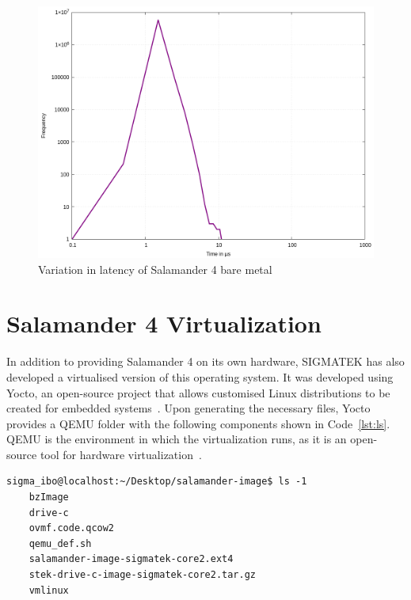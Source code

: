 \documentclass[MMR,Master,english]{twbook}
\begin{document}
\begin{figure}[H]
	\centering
	\includegraphics[width=0.7\columnwidth]{masterthesis-documentation/docs/sigmatek/xenomai/0hardware/gnuplot_max_latency_hardware.png}
	\caption[Variation in latency of Salamander 4 bare metal]{Variation in latency of Salamander 4 bare metal}
	\label{fig:gnuplot_max_latency_hardware}
\end{figure}


\section{Salamander 4 Virtualization}\label{sec:salamander4-virtualization}
In addition to providing Salamander 4 on its own hardware, SIGMATEK has also developed a virtualised version of this operating system. It was developed using Yocto, an open-source project that allows customised Linux distributions to be created for embedded systems~\cite{WelcomeYoctoProject}. Upon generating the necessary files, Yocto provides a QEMU folder with the following components shown in Code~\ref{lst:ls}. QEMU is the environment in which the virtualization runs, as it is an open-source tool for hardware virtualization~\cite{QEMU}.

\vspace{1em}
\begin{minipage}{\linewidth}
	\begin{lstlisting}[name={Contents of QEMU folder for Salamander 4},label={lst:ls}]
    sigma_ibo@localhost:~/Desktop/salamander-image$ ls -1
    bzImage
    drive-c
    ovmf.code.qcow2
    qemu_def.sh
    salamander-image-sigmatek-core2.ext4
    stek-drive-c-image-sigmatek-core2.tar.gz
    vmlinux
    \end{lstlisting}
\end{minipage}
\end{document}
